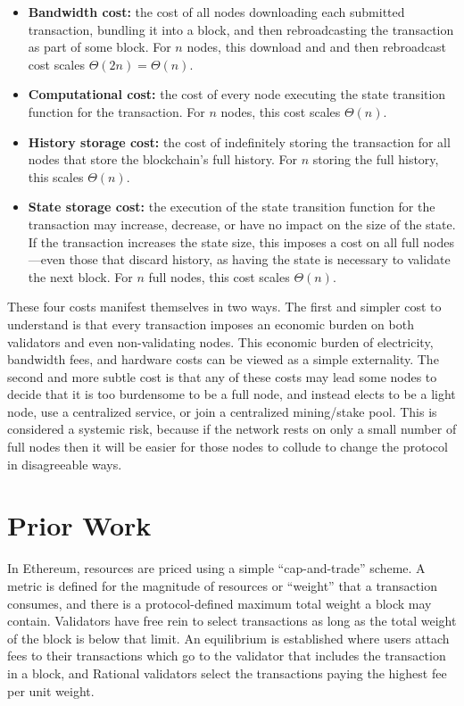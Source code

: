 \documentclass[12pt, final]{article}
\begin{document}
\begin{itemize}
\item[] \textbf{Bandwidth cost:} the cost of all nodes downloading each submitted transaction, bundling it into a block, and then rebroadcasting the transaction as part of some block.  For $n$ nodes, this download and and then rebroadcast cost scales $\Theta(2n) = \Theta(n)$.

\item[] \textbf{Computational cost:} the cost of every node executing the state transition function for the transaction.  For $n$ nodes, this cost scales $\Theta(n)$.

\item[] \textbf{History storage cost:} the cost of indefinitely storing the transaction for all nodes that store the blockchain's full history.  For $n$ storing the full history, this scales $\Theta(n)$.

\item[] \textbf{State storage cost:} the execution of the state transition function for the transaction may increase, decrease, or have no impact on the size of the state. If the transaction increases the state size, this imposes a cost on all full nodes---even those that discard history, as having the state is necessary to validate the next block.  For $n$ full nodes, this cost scales $\Theta(n)$.
\end{itemize}

These four costs manifest themselves in two ways. The first and simpler cost to understand is that every transaction imposes an economic burden on both validators and even non-validating nodes.  This economic burden of electricity, bandwidth fees, and hardware costs can be viewed as a simple externality. The second and more subtle cost is that any of these costs may lead some nodes to decide that it is too burdensome to be a full node, and instead elects to be a light node, use a centralized service\cite{infura}, or join a centralized mining/stake pool. This is considered a systemic risk, because if the network rests on only a small number of full nodes then it will be easier for those nodes to collude to change the protocol in disagreeable ways.


\section{Prior Work}

In Ethereum, resources are priced using a simple ``cap-and-trade'' scheme. A metric is defined for the magnitude of resources or ``weight'' that a transaction consumes, and there is a protocol-defined maximum total weight a block may contain. Validators have free rein to select transactions as long as the total weight of the block is below that limit. An equilibrium is established where users attach fees to their transactions which go to the validator that includes the transaction in a block, and Rational validators select the transactions paying the highest fee per unit weight.
\end{document}
